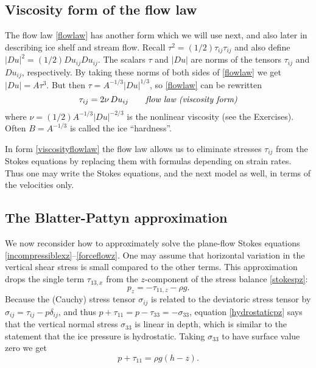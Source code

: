 \documentclass[letterpaper,final,12pt,reqno]{amsart}
\begin{document}
\subsection*{Viscosity form of the flow law}  The flow law \eqref{flowlaw} has another form which we will use next, and also later in describing ice shelf and stream flow.  Recall $\tau^2 = (1/2) \tau_{ij} \tau_{ij}$ and also define $|Du|^2 = (1/2) Du_{ij} Du_{ij}$.  The scalars $\tau$ and $|Du|$ are norms of the tensors $\tau_{ij}$ and $Du_{ij}$, respectively.  By taking these norms of both sides of \eqref{flowlaw} we get $|Du| = A \tau^3$.  But then $\tau = A^{-1/3} |Du|^{1/3}$, so \eqref{flowlaw} can be rewritten
\begin{equation}
\tau_{ij} = 2 \nu\, Du_{ij}  \qquad \text{\emph{flow law (viscosity form)}} \label{viscosityflowlaw}
\end{equation}
where $\nu = (1/2) A^{-1/3} |Du|^{-2/3}$ is the nonlinear viscosity (see the Exercises).  Often $B = A^{-1/3}$ is called the ice ``hardness''.

In form \eqref{viscosityflowlaw} the flow law allows us to eliminate stresses $\tau_{ij}$ from the Stokes equations by replacing them with formulas depending on strain rates.  Thus one may write the Stokes equations, and the next model as well, in terms of the velocities only.

\subsection*{The Blatter-Pattyn approximation}  We now reconsider how to approximately solve the plane-flow Stokes equations \eqref{incompressiblexz}--\eqref{forceflowz}.  One may assume that horizontal variation in the vertical shear stress is small compared to the other terms.  This approximation drops the single term  $\tau_{13,x}$ from the $z$-component of the stress balance \eqref{stokespz}:
\begin{equation}
p_z = - \tau_{11,z} - \rho g. \label{hydrostaticpz}
\end{equation}
Because the (Cauchy) stress tensor $\sigma_{ij}$ is related to the deviatoric stress tensor by $\sigma_{ij} = \tau_{ij} - p \delta_{ij}$, and thus $p + \tau_{11} = p - \tau_{33} = - \sigma_{33}$, equation \eqref{hydrostaticpz} says that the vertical normal stress $\sigma_{33}$ is linear in depth, which is similar to the statement that the ice pressure is hydrostatic.  Taking $\sigma_{33}$ to have surface value zero we get
\begin{equation}
p + \tau_{11} = \rho g (h-z). \label{hydrostaticitself}
\end{equation}
\end{document}
